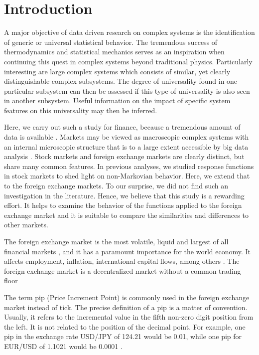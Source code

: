 \section{Introduction}\label{sec:introduction}

A major objective of data driven research on complex systems is the
identification of generic or universal statistical behavior. The tremendous
success of thermodynamics and statistical mechanics serves as an inspiration
when continuing this quest in complex systems beyond traditional physics.
Particularly interesting are large complex systems which consists of similar,
yet clearly distinguishable complex subsystems. The degree of universality
found in one particular subsystem can then be assessed if this type of
universality is also seen in another subsystem. Useful information on the impact
of specific system features on this universality may then be inferred.

Here, we carry out such a study for finance, because a tremendous amount of
data is available \cite{physicists_contribution}. Markets may be viewed as
macroscopic complex systems with an internal microscopic structure that is to a
large extent accessible by big data analysis \cite{complex_markets}.
Stock markets and foreign exchange markets are clearly distinct, but share many
common features. In previous analyses, we studied response functions in stock
markets to shed light on non-Markovian behavior. Here, we extend that to the
foreign exchange markets. To our surprise, we did not find such an
investigation in the literature. Hence, we believe that this study is a
rewarding effort. It helps to examine the behavior of the functions applied to
the foreign exchange market and it is suitable to compare the similarities and
differences to other markets.

The foreign exchange market is the most volatile, liquid and largest of all
financial markets
\cite{forex_liquidity,info_forex,forex_market_micro,intraday_forex}, and it has
a paramount importance for the world economy. It affects employment, inflation,
international capital flows, among others \cite{forex_structure}. The foreign
exchange market is a decentralized market without a common trading floor
\cite{info_forex,forex_market_micro,forex_structure,teach_spread}

The term pip (Price Increment Point) is commonly used in the foreign exchange
market instead of tick. The precise definition of a pip is a matter of
convention. Usually, it refers to the incremental value in the fifth non-zero
digit position from the left. It is not related to the position of the decimal
point. For example, one pip in the exchange rate USD/JPY of 124.21 would be
0.01, while one pip for EUR/USD of 1.1021 would be 0.0001
\cite{forex_market_micro,forex_structure,order_flow_forex,micro_eff}.

